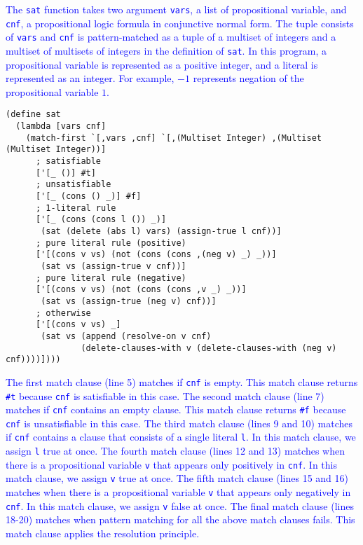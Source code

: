 \documentclass[acmlarge]{acmart}
\newcommand{\new}[1]{\textcolor{blue}{#1}}
\begin{document}
\new{
The \lstinline{sat} function takes two argument \lstinline{vars}, a list of propositional variable, and \lstinline{cnf}, a propositional logic formula in conjunctive normal form.
The tuple consists of \lstinline{vars} and \lstinline{cnf} is pattern-matched as a tuple of a multiset of integers and a multiset of multisets of integers in the definition of \lstinline{sat}.
In this program, a propositional variable is represented as a positive integer, and a literal is represented as an integer.
For example, $-1$ represents negation of the propositional variable $1$.
}%

\begin{lstlisting}[language=egison]
(define sat
  (lambda [vars cnf]
    (match-first `[,vars ,cnf] `[,(Multiset Integer) ,(Multiset (Multiset Integer))]
      ; satisfiable
      ['[_ ()] #t]
      ; unsatisfiable
      ['[_ (cons () _)] #f]
      ; 1-literal rule
      ['[_ (cons (cons l ()) _)]
       (sat (delete (abs l) vars) (assign-true l cnf))]
      ; pure literal rule (positive)
      ['[(cons v vs) (not (cons (cons ,(neg v) _) _))]
       (sat vs (assign-true v cnf))]
      ; pure literal rule (negative)
      ['[(cons v vs) (not (cons (cons ,v _) _))]
       (sat vs (assign-true (neg v) cnf))]
      ; otherwise
      ['[(cons v vs) _]
       (sat vs (append (resolve-on v cnf)
               (delete-clauses-with v (delete-clauses-with (neg v) cnf))))])))
\end{lstlisting}

\noindent
\new{
The first match clause (line 5) matches if \lstinline{cnf} is empty.
This match clause returns \lstinline{#t} because \lstinline{cnf} is satisfiable in this case.
The second match clause (line 7) matches if \lstinline{cnf} contains an empty clause.
This match clause returns \lstinline{#f} because \lstinline{cnf} is unsatisfiable in this case.
The third match clause (lines 9 and 10) matches if \lstinline{cnf} contains a clause that consists of a single literal \lstinline{l}.
In this match clause, we assign \lstinline{l} true at once.
The fourth match clause (lines 12 and 13) matches when there is a propositional variable \lstinline{v} that appears only positively in \lstinline{cnf}.
In this match clause, we assign \lstinline{v} true at once.
The fifth match clause (lines 15 and 16) matches when there is a propositional variable \lstinline{v} that appears only negatively in \lstinline{cnf}.
In this match clause, we assign \lstinline{v} false at once.
The final match clause (lines 18-20) matches when pattern matching for all the above match clauses fails.
This match clause applies the resolution principle.
}%
\end{document}
